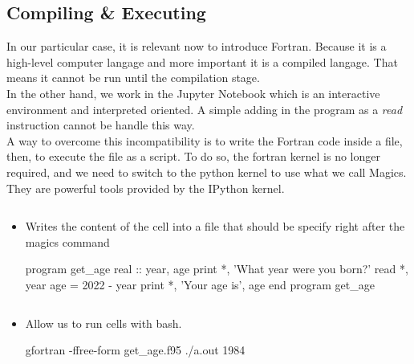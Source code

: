 \documentclass[10pt,a4paper]{article}
\begin{document}
\subsection{Compiling \& Executing}
In our particular case, it is relevant now to introduce Fortran. Because it is a high-level computer langage and more important it is a compiled langage. That means it cannot be run until the compilation stage.\\
In the other hand, we work in the Jupyter Notebook which is an interactive environment and interpreted oriented. A simple adding in the program as a \textit{read} instruction cannot be handle this way.\\
A way to overcome this incompatibility is to write the Fortran code inside a file, then, to execute the file as a script.
To do so, the fortran kernel is no longer required, and we need to switch to the python kernel to use what we call Magics. They are powerful tools provided by the IPython kernel.
\begin{itemize}

\item
\begin{lstlisting}[language=bash]
%%writefile
\end{lstlisting}
Writes the content of the cell into a file that should be specify right after the magics command
\begin{mylisting}

program get_age
    real :: year, age
    print *, 'What year were you born?'
    read *, year
    age = 2022 - year
    print *, 'Your age is', age
end program get_age
\end{mylisting}
\item 
\begin{lstlisting}[language=bash]
%%bash
\end{lstlisting}
Allow us to run cells with bash.
\begin{mylisting}

gfortran -ffree-form get_age.f95
./a.out
1984
\end{mylisting}
\end{itemize}
\end{document}
